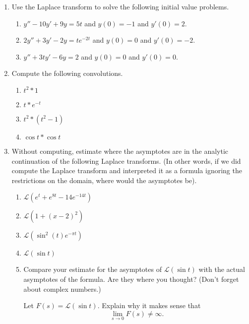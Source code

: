 \documentclass[letter]{article}
\begin{document}
\begin{enumerate}
		\item Use the Laplace transform to solve the following initial value problems.
			\begin{enumerate}
				\item $y''-10y'+9y=5t$ and $y(0)=-1$ and $y'(0)=2$.
				\item $2y''+3y'-2y=te^{-2t}$ and $y(0)=0$ and $y'(0)=-2$.
				\item $y''+3ty'-6y=2$ and $y(0)=0$ and $y'(0)=0$.
			\end{enumerate}
		\item Compute the following convolutions.
			\begin{enumerate}
				\item $t^2 * 1$
				\item $t*e^{-t}$
				\item $t^2*(t^2-1)$
				\item $\cos t*\cos t$
			\end{enumerate}
		\item Without computing, estimate where the asymptotes are in
			the analytic continuation of the following Laplace transforms.
			(In other words, if we did compute the Laplace transform
			and interpreted it as a formula ignoring the restrictions on 
			the domain, where would the asymptotes be).
			\begin{enumerate}
				\item $\mathscr{L}(e^t+e^{8t}-14e^{-14t})$
				\item $\mathscr L(1+(x-2)^2)$
				\item $\mathscr L(\sin^2(t)e^{-\pi t})$
				\item $\mathscr L(\sin t)$
				\item Compare your estimate for the asymptotes of $\mathscr L(\sin t)$ with
					the actual asymptotes of the formula.  Are they where you thought?
					(Don't forget about complex numbers.)

					Let $F(s) = \mathscr L(\sin t)$.  Explain why it makes sense that 
					\[
						\lim_{s\to 0} F(s) \neq \infty.
					\]


\end{enumerate}
\end{enumerate}
\end{document}
